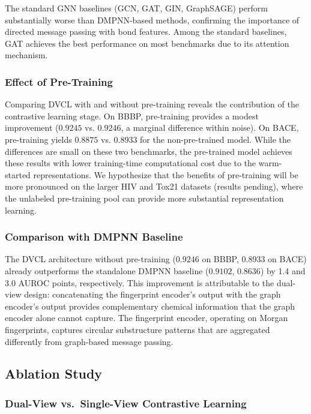 \documentclass[a4paper,fleqn]{cas-sc}
\begin{document}
The standard GNN baselines (GCN, GAT, GIN, GraphSAGE) perform substantially worse than DMPNN-based methods, confirming the importance of directed message passing with bond features. Among the standard baselines, GAT achieves the best performance on most benchmarks due to its attention mechanism.

\subsubsection{Effect of Pre-Training}

Comparing DVCL with and without pre-training reveals the contribution of the contrastive learning stage. On BBBP, pre-training provides a modest improvement ($0.9245$ vs. $0.9246$, a marginal difference within noise). On BACE, pre-training yields $0.8875$ vs. $0.8933$ for the non-pre-trained model. While the differences are small on these two benchmarks, the pre-trained model achieves these results with lower training-time computational cost due to the warm-started representations. We hypothesize that the benefits of pre-training will be more pronounced on the larger HIV and Tox21 datasets (results pending), where the unlabeled pre-training pool can provide more substantial representation learning.

\subsubsection{Comparison with DMPNN Baseline}

The DVCL architecture without pre-training ($0.9246$ on BBBP, $0.8933$ on BACE) already outperforms the standalone DMPNN baseline ($0.9102$, $0.8636$) by 1.4 and 3.0 AUROC points, respectively. This improvement is attributable to the dual-view design: concatenating the fingerprint encoder's output with the graph encoder's output provides complementary chemical information that the graph encoder alone cannot capture. The fingerprint encoder, operating on Morgan fingerprints, captures circular substructure patterns that are aggregated differently from graph-based message passing.

\subsection{Ablation Study}\label{sec:ablation}

\subsubsection{Dual-View vs.\ Single-View Contrastive Learning}
\end{document}
